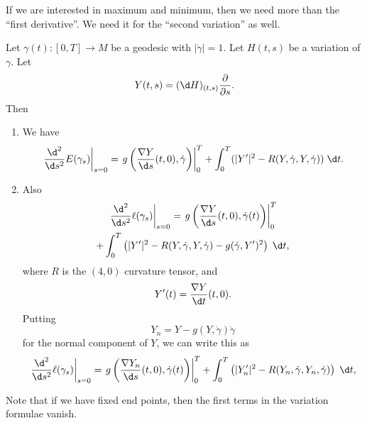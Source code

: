 \documentclass[a4paper]{article}
\begin{document}
If we are interested in maximum and minimum, then we need more than the ``first derivative''. We need it for the ``second variation'' as well.

\begin{thm}\leavevmode
  Let $\gamma(t): [0, T] \to M$ be a geodesic with $|\dot{\gamma}| = 1$. Let $H(t, s)$ be a variation of $\gamma$. Let
  \[
    Y(t, s) = (\d H)_{(t, s)} \frac{\partial}{\partial s}.
  \]
  Then
  \begin{enumerate}
    \item We have
      \[
        \left.\frac{\d^2}{\d s^2} E(\gamma_s)\right|_{s = 0} = \left.g\left(\frac{\nabla Y}{\d s}(t, 0), \dot{\gamma}\right)\right|_0^T + \int_0^T (|Y'|^2 - R(Y, \dot\gamma, Y, \dot{\gamma})) \;\d t.
      \]
    \item Also
      \begin{multline*}
        \left.\frac{\d^2}{\d s^2}\ell(\gamma_s)\right|_{s = 0} = \left.g\left(\frac{\nabla Y}{\d s} (t, 0), \dot{\gamma}(t)\right)\right|_0^T \\
        + \int_0^T \left( |Y'|^2 - R(Y, \dot{\gamma}, Y, \dot{\gamma}) - g(\dot{\gamma}, Y')^2\right)\;\d t,
      \end{multline*}
      where $R$ is the $(4, 0)$ curvature tensor, and
      \[
        Y'(t) = \frac{\nabla Y}{\d t}(t, 0).
      \]
      Putting
      \[
        Y_n = Y - g(Y, \dot{\gamma}) \dot{\gamma}
      \]
      for the normal component of $Y$, we can write this as
      \[
        \left.\frac{\d^2}{\d s^2}\ell(\gamma_s)\right|_{s = 0} = \left.g\left(\frac{\nabla Y_n}{\d s} (t, 0), \dot{\gamma}(t)\right)\right|_0^T + \int_0^T \left( |Y'_n|^2 - R(Y_n, \dot{\gamma}, Y_n, \dot{\gamma})\right)\;\d t,
      \]
  \end{enumerate}
\end{thm}
Note that if we have fixed end points, then the first terms in the variation formulae vanish.
\end{document}
